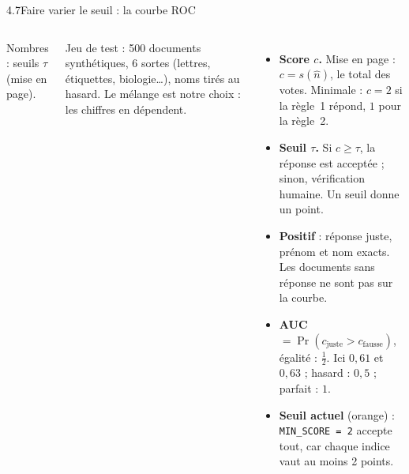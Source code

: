 \documentclass[11pt,aspectratio=169]{beamer}
\newcommand{\tok}[1]{\foreignlanguage{english}{\texttt{#1}}}
\begin{document}
\begin{frame}{4.7\quad Faire varier le seuil : la courbe ROC}
  \begin{columns}[T]
    \centering
    \par
    {\scriptsize\color{mlgray} Nombres : seuils $\tau$ (mise en page).\par
    \medskip
    Jeu de test : 500 documents synthétiques, 6 sortes (lettres, étiquettes, biologie…), noms
    tirés au hasard. Le mélange est notre choix : les chiffres en dépendent.\par}

    \small
    \begin{itemize}\setlength{\itemsep}{1pt}
      \item \textbf{Score $c$.} Mise en page : $c = s(\hat n)$, le total des votes.
        Minimale : $c = 2$ si la règle~1 répond, $1$ pour la règle~2.
      \item \textbf{Seuil $\tau$.} Si $c \ge \tau$, la réponse est acceptée ; sinon,
        vérification humaine. Un seuil donne un point.
      \item \textbf{Positif} : réponse juste, prénom et nom exacts. Les documents sans
        réponse ne sont pas sur la courbe.
      \item \textbf{AUC} $= \Pr(c_{\text{juste}} > c_{\text{fausse}})$, égalité :
        $\tfrac12$. Ici $0{,}61$ et $0{,}63$ ; hasard : $0{,}5$ ; parfait : $1$.
      \item \textbf{Seuil actuel} (orange) : \tok{MIN\_SCORE = 2} accepte tout, car chaque
        indice vaut au moins 2 points.
    \end{itemize}
  \end{columns}
\end{frame}
\end{document}

